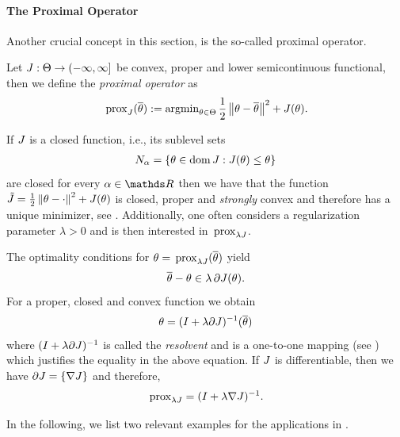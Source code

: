 \paragraph{The Proximal Operator} Another crucial concept in this section, is the so-called proximal operator.
%
\begin{definition}{}{}
Let $J:\Theta\to(-\infty,\infty]$  be convex, proper and lower semicontinuous functional, then we define the \emph{proximal operator} as
\begin{align*}
    \,\mathrm{prox}_{J}(\overline{\theta}) := \operatorname{argmin}_{\theta\in\Theta} \frac{1}{2}\left\|\theta-\overline{\theta}\right\|^2 + J(\theta).
\end{align*}
\end{definition}
%
\noindent%
If $J$ is a closed function, i.e., its sublevel sets
%
\begin{align*}
N_\alpha = \{\theta\in\operatorname{dom} J: J(\theta)\leq \theta\}
\end{align*} 
%
are closed for every $\alpha\in\R$ then we have that the function $\tilde J = \frac{1}{2}\left\|\theta -\cdot\right\|^2 + J(\theta)$ is closed, proper and \emph{strongly} convex and therefore has a unique minimizer, see \cite[Thm. 27.1]{rockafellar1997convex}. Additionally, one often considers a regularization parameter $\lambda>0$ and is then interested in $\,\mathrm{prox}_{\lambda J}$.
%
\begin{remark}{}{}
The optimality conditions for $\theta=\,\mathrm{prox}_{\lambda J}(\overline{\theta})$ yield 
%
\begin{align*}
\pparam - \param \in \lambda\, \partial \func(\param).%
\end{align*}
%
For a proper, closed and convex function we obtain
%
\begin{align*}
\theta = (I + \lambda\partial J)^{-1}(\overline\theta)
\end{align*}
%
where $(I + \lambda\partial J)^{-1}$ is called the \emph{resolvent} and is a one-to-one mapping (see \cite[Ch. 3.2]{parikh2014proximal})  which justifies the equality in the above equation. If $J$ is differentiable, then we have $\partial J = \{\nabla J\}$ and therefore,
%
\begin{align*}
\,\mathrm{prox}_{\lambda J} = (I + \lambda\nabla J)^{-1}.
\end{align*}
\end{remark}
%
%
\noindent%
In the following, we list two relevant examples for the applications in \cite{bungert2022bregman, bungert2021neural}.
%
